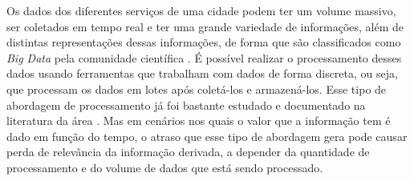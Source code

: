 

 
Os dados dos diferentes serviços de uma cidade podem ter um volume massivo, ser coletados em tempo real e ter uma grande variedade de informações, além de distintas representações dessas informações, de forma que são classificados como \textit{Big Data} pela comunidade científica \citep{DBLP:journals/corr/WardB13a}.
É possível realizar o processamento desses dados usando ferramentas que trabalham com dados de forma discreta, ou seja, que processam os dados em lotes após coletá-los e armazená-los. Esse tipo de abordagem de processamento já foi bastante estudado e documentado na literatura da área \citep{Dean:2010:MFD:1629175.1629198, DBLP:journals/corr/MoniruzzamanH13,computers3040117}.
Mas em cenários nos quais o valor que a informação tem é dado em função do tempo,
o atraso que esse tipo de abordagem gera pode causar perda de relevância da informação derivada, a depender da quantidade de processamento e do volume de dados que está sendo processado.


